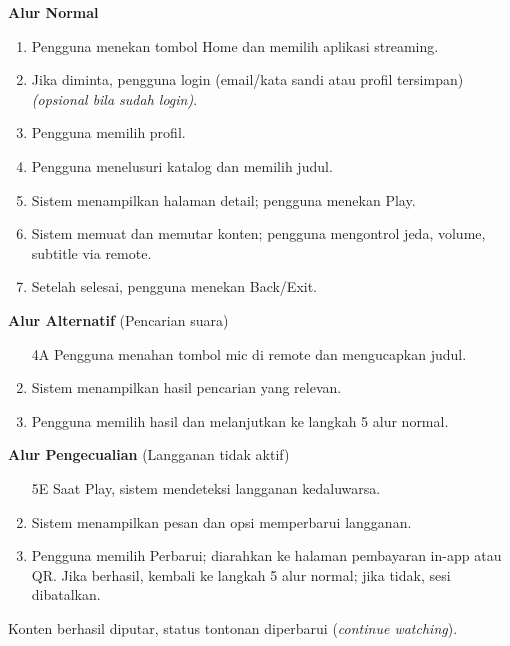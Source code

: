 \documentclass[a4paper]{article}
\begin{document}
\begin{enumerate}[itemsep=1em]
\begin{itemize}[itemsep=1em]
    \textbf{Alur Normal}
    \begin{enumerate}[nosep]
      \item Pengguna menekan tombol Home dan memilih aplikasi streaming.
      \item Jika diminta, pengguna login (email/kata sandi atau profil tersimpan) \textit{(opsional bila sudah login)}.
      \item Pengguna memilih profil.
      \item Pengguna menelusuri katalog dan memilih judul.
      \item Sistem menampilkan halaman detail; pengguna menekan Play.
      \item Sistem memuat dan memutar konten; pengguna mengontrol jeda, volume, subtitle via remote.
      \item Setelah selesai, pengguna menekan Back/Exit.
    \end{enumerate}

    \vspace{1em}

    \textbf{Alur Alternatif} (Pencarian suara)
    \begin{enumerate}[nosep]
      \item[4A] Pengguna menahan tombol mic di remote dan mengucapkan judul.
      \item Sistem menampilkan hasil pencarian yang relevan.
      \item Pengguna memilih hasil dan melanjutkan ke langkah 5 alur normal.
    \end{enumerate}

    \vspace{1em}

    \textbf{Alur Pengecualian} (Langganan tidak aktif)
    \begin{enumerate}[nosep]
      \item[5E] Saat Play, sistem mendeteksi langganan kedaluwarsa.
      \item Sistem menampilkan pesan dan opsi memperbarui langganan.
      \item Pengguna memilih Perbarui; diarahkan ke halaman pembayaran in-app atau QR. Jika berhasil, kembali ke langkah 5 alur normal; jika tidak, sesi dibatalkan.
    \end{enumerate}
    
    \vspace{1em}

    \begin{description}[leftmargin=0.5cm, style=nextline]
      \item[Post-condition] Konten berhasil diputar, status tontonan diperbarui (\textit{continue watching}).
    \end{description}


\end{itemize}
\end{enumerate}
\end{document}
